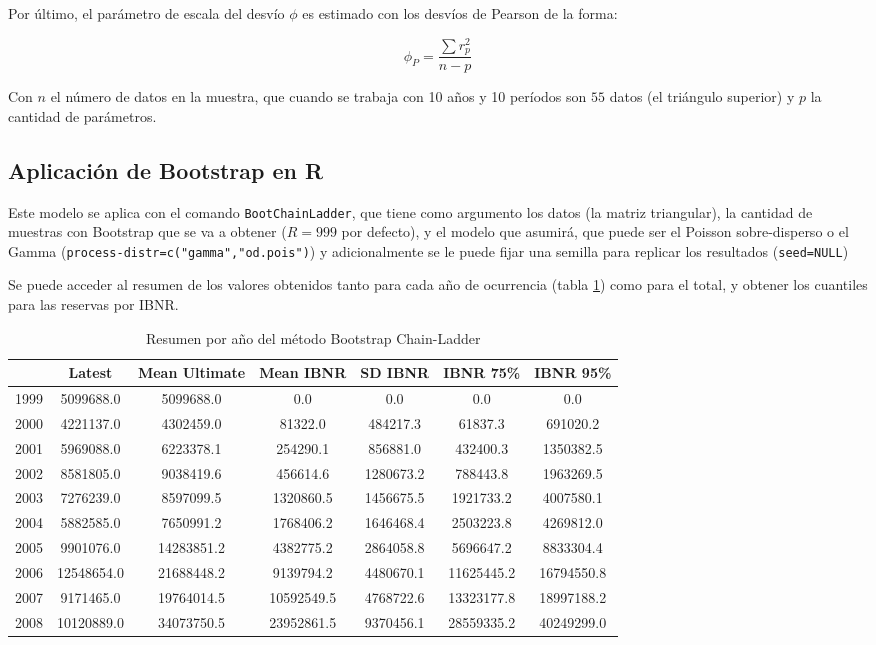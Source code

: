 \documentclass[
  12pt,
]{article}
\begin{document}
Por último, el parámetro de escala del desvío \(\phi\) es estimado con
los desvíos de Pearson de la forma:

\[
\phi_P = \frac{\sum r_p^2}{n-p}
\]

Con \(n\) el número de datos en la muestra, que cuando se trabaja con 10
años y 10 períodos son \(55\) datos (el triángulo superior) y \(p\) la
cantidad de parámetros.

\subsection{Aplicación de Bootstrap en
R}\label{aplicaciuxf3n-de-bootstrap-en-r}

Este modelo se aplica con el comando \texttt{BootChainLadder}, que tiene
como argumento los datos (la matriz triangular), la cantidad de muestras
con Bootstrap que se va a obtener (\(R=999\) por defecto), y el modelo
que asumirá, que puede ser el Poisson sobre-disperso o el Gamma
(\texttt{process-distr=c("gamma","od.pois")}) y adicionalmente se le
puede fijar una semilla para replicar los resultados
(\texttt{seed=NULL})

Se puede acceder al resumen de los valores obtenidos tanto para cada año
de ocurrencia (tabla \ref{anual bootstrap}) como para el total, y
obtener los cuantiles para las reservas por IBNR.

\begin{table}[ht]
\centering
\caption{Resumen por año del método Bootstrap Chain-Ladder} 
\label{anual bootstrap}
\begin{tabular}{lcccccc}
  \hline
 & Latest & Mean Ultimate & Mean IBNR & SD IBNR & IBNR 75\% & IBNR 95\% \\ 
  \hline
1999 & 5099688.0 & 5099688.0 & 0.0 & 0.0 & 0.0 & 0.0 \\ 
  2000 & 4221137.0 & 4302459.0 & 81322.0 & 484217.3 & 61837.3 & 691020.2 \\ 
  2001 & 5969088.0 & 6223378.1 & 254290.1 & 856881.0 & 432400.3 & 1350382.5 \\ 
  2002 & 8581805.0 & 9038419.6 & 456614.6 & 1280673.2 & 788443.8 & 1963269.5 \\ 
  2003 & 7276239.0 & 8597099.5 & 1320860.5 & 1456675.5 & 1921733.2 & 4007580.1 \\ 
  2004 & 5882585.0 & 7650991.2 & 1768406.2 & 1646468.4 & 2503223.8 & 4269812.0 \\ 
  2005 & 9901076.0 & 14283851.2 & 4382775.2 & 2864058.8 & 5696647.2 & 8833304.4 \\ 
  2006 & 12548654.0 & 21688448.2 & 9139794.2 & 4480670.1 & 11625445.2 & 16794550.8 \\ 
  2007 & 9171465.0 & 19764014.5 & 10592549.5 & 4768722.6 & 13323177.8 & 18997188.2 \\ 
  2008 & 10120889.0 & 34073750.5 & 23952861.5 & 9370456.1 & 28559335.2 & 40249299.0 \\ 
   \hline
\end{tabular}
\end{table}
\end{document}
